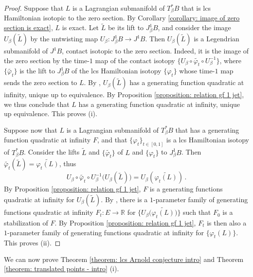 \documentclass{amsart}
\theoremstyle{remark}
\begin{document}
\begin{proof}
Suppose that $L$ is a Lagrangian submanifold of $T^{\ast}_{\beta} B$
that is lcs Hamiltonian isotopic to the zero section.
By Corollary \ref{corollary: image of zero section is exact},
$L$ is exact.
Let $\widetilde{L}$ be its lift to $J_{\beta}^1B$,
and consider the image $U_{\beta} (\widetilde{L})$
by the untwisting map $U_{\beta}: J_{\beta}^1B \rightarrow J^1B$.
Then $U_{\beta} (\widetilde{L})$ is a Legendrian submanifold of $J^1B$,
contact isotopic to the zero section.
Indeed,
it is the image of the zero section
by the time-$1$ map of the contact isotopy
$\{ U_{\beta} \circ \widetilde{\varphi_t} \circ U_{\beta}^{-1} \}$,
where $\{\widetilde{\varphi_t}\}$
is the lift to $J^1_{\beta}B$
of the lcs Hamiltonian isotopy $\{\varphi_t\}$
whose time-$1$ map sends the zero section to $L$.
By \cite{Chaperon, Chekanov, Viterbo, Theret},
$U_{\beta} (\widetilde{L})$ has a generating function quadratic at infinity,
unique up to equivalence.
By Proposition \ref{proposition: relation gf 1 jet},
we thus conclude that $L$ has a generating function quadratic at infinity,
unique up equivalence.
This proves (i).

Suppose now that $L$ is a Lagrangian submanifold
of $T^{\ast}_{\beta} B$
that has a generating function quadratic at infinity $F$,
and that $\{\varphi_t\}_{t \in [0,1]}$
is a lcs Hamiltonian isotopy of $T^{\ast}_{\beta} B$.
Consider the lifts $\widetilde{L}$ and $\{\widetilde{\varphi_t}\}$
of $L$ and $\{\varphi_t\}$ to $J^1_{\beta}B$.
Then $\widetilde{\varphi_t} (\widetilde{L}) = \widetilde{\varphi_t(L)}$,
thus
\[
U_{\beta} \circ \widetilde{\varphi_t} \circ U_{\beta}^{-1}
\big( U_{\beta} (\widetilde{L}) \big)
= U_{\beta} (\widetilde{\varphi_t(L)}) \,.
\]
By Proposition \ref{proposition: relation gf 1 jet},
$F$ is a generating functions quadratic at infinity
for $U_{\beta} (\widetilde{L})$.
By \cite{Chaperon, Chekanov},
there is a $1$-parameter family
of generating functions quadratic at infinity
$F_t: E \rightarrow \mathbb{R}$
for $\{ U_{\beta} \big( \widetilde{\varphi_t (L)} \big) \}$
such that $F_0$ is a stabilization of $F$.
By Proposition \ref{proposition: relation gf 1 jet},
$F_t$ is then also a $1$-parameter family
of generating functions quadratic at infinity
for $\{\varphi_t(L)\}$.
This proves (ii).
\end{proof}

We can now prove Theorem \ref{theorem: lcs Arnold conjecture intro}
and Theorem \ref{theorem: translated points - intro} (i).
\end{document}

